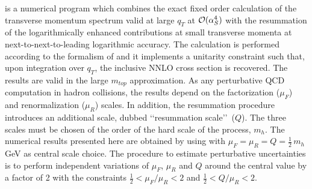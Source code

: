 \subsubsection{\HqT}
\label{sec:hjetscomp:tools:ares:hqt}

\HqT \cite{Bozzi:2005wk,deFlorian:2011xf} is a numerical program which 
combines the exact fixed order calculation of the transverse momentum 
spectrum valid at large $q_T$ at ${\cal O}(\alpha_S^4)$ with the 
resummation of the logarithmically enhanced contributions at small 
transverse momenta at next-to-next-to-leading logarithmic accuracy.
The calculation is performed according to the formalism of 
\cite{Catani:2000vq,Bozzi:2005wk} and it implements a unitarity 
constraint such that, upon integration over $q_T$, the inclusive 
NNLO cross section is recovered. The results are valid in the large 
$m_{top}$ approximation. As any perturbative QCD computation in hadron 
collisions, the results depend on the factorization ($\mu_F$) and 
renormalization ($\mu_R$) scales. In addition, the resummation procedure 
introduces an additional scale, dubbed \lq\lq resummation scale\rq\rq\ 
($Q$). The three scales must be chosen of the order of the hard scale 
of the process, $m_h$. The numerical results presented here are obtained 
by using \HqT-2.0 with $\mu_F=\mu_R=Q=\tfrac{1}{2}\,m_h$ GeV as central scale choice. 
The procedure to estimate perturbative uncertainties is to perform 
independent variations of $\mu_F$, $\mu_R$ and $Q$ around the central 
value by a factor of 2 with the constraints $\tfrac{1}{2} < \mu_F/\mu_R < 2$ and 
$\tfrac{1}{2} <Q/\mu_R<2$.